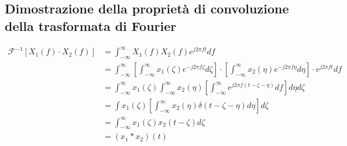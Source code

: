 \documentclass[a4paper,10pt]{article}
\theoremstyle{mystyle}
\begin{document}

\subsection{Dimostrazione della proprietà di convoluzione della trasformata di Fourier}
\begin{align*}
    \mathcal{F}^{-1}[X_1 (f) \cdot X_2 (f) ]
    &= \int_{-\infty}^{\infty} X_1(f) X_2(f) e^{j2 \pi f t} df \\
    &= \int_{-\infty}^{\infty} \left[ \int_{-\infty}^{\infty} x_1 (\zeta) e^{-j2 \pi f \zeta} d\zeta \right] \cdot \left[ \int_{-\infty}^{\infty}x_2 (\eta) e^{-j 2 \pi f \eta} d \eta \right] \cdot e^{j 2 \pi f t} df \\
    &= \int_{-\infty}^{\infty} x_1 (\zeta) \int_{-\infty}^{\infty}x_2 (\eta) \left[ \int_{-\infty}^{\infty} e^{j2 \pi f (t-\zeta - \eta)}df \right] d \eta d \zeta \\
    &= \int x_1(\zeta) \left[ \int_{-\infty}^{\infty} x_2 (\eta) \delta(t-\zeta -\eta) d\eta \right] d\zeta \\
    &= \int_{-\infty}^{\infty} x_1(\zeta) x_2 (t-\zeta) d\zeta \\
    &= (x_1 * x_2)(t)
\end{align*}
\end{document}
